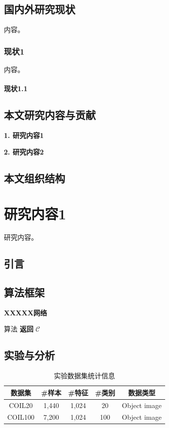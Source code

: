 \documentclass[doctor]{thesis}
\begin{document}
\section{国内外研究现状}
内容。

\subsection{现状1}
内容。

\subsubsection{现状1.1}


\section{本文研究内容与贡献}

\textbf{1. 研究内容1}


\textbf{2. 研究内容2}



\section{本文组织结构}


\chapter{研究内容1}
研究内容。

\section{引言}


\section{算法框架}


\begin{algorithm}[!t]
    \caption{\textbf{XXXXX网络}}
    算法
    \textbf{返回} $\mathcal{C}$
\end{algorithm}



\section{实验与分析}


\begin{table}[!t]
  \centering
  \caption{实验数据集统计信息}
  \begin{tabular}{*{5}{c}}
      \toprule
          数据集      & \#样本     & \#特征     & \#类别      & 数据类型 \\
      \midrule
          COIL20      & 1,440     & 1,024      & 20        & Object image \\
          COIL100     & 7,200     & 1,024      & 100       & Object image \\
      \bottomrule
  \end{tabular}
  \label{chapter_sgae_tab_datasets}
\end{table}
\end{document}
